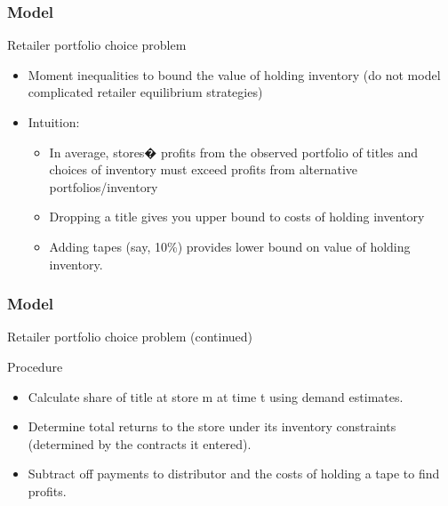 
\begin{frame}
\frametitle{Model}

Retailer portfolio choice problem

\begin{itemize}
\item Moment inequalities to bound the value of holding inventory (do not
model complicated retailer equilibrium strategies)

\item Intuition:

\begin{itemize}
\item In average, stores� profits from the observed portfolio of
titles and choices of inventory must exceed profits from alternative
portfolios/inventory

\item Dropping a title gives you upper bound to costs of holding inventory

\item Adding tapes (say, 10\%) provides lower bound on value of holding
inventory.
\end{itemize}

\end{itemize}
\end{frame}

\begin{frame}
\frametitle{Model}

Retailer portfolio choice problem (continued)

Procedure

\begin{itemize}
\item Calculate share of title at store m at time t using demand estimates.

\item Determine total returns to the store under its inventory constraints
(determined by the contracts it entered).

\item Subtract off payments to distributor and the costs of holding a tape
to find profits.
\end{itemize}
\end{frame}


